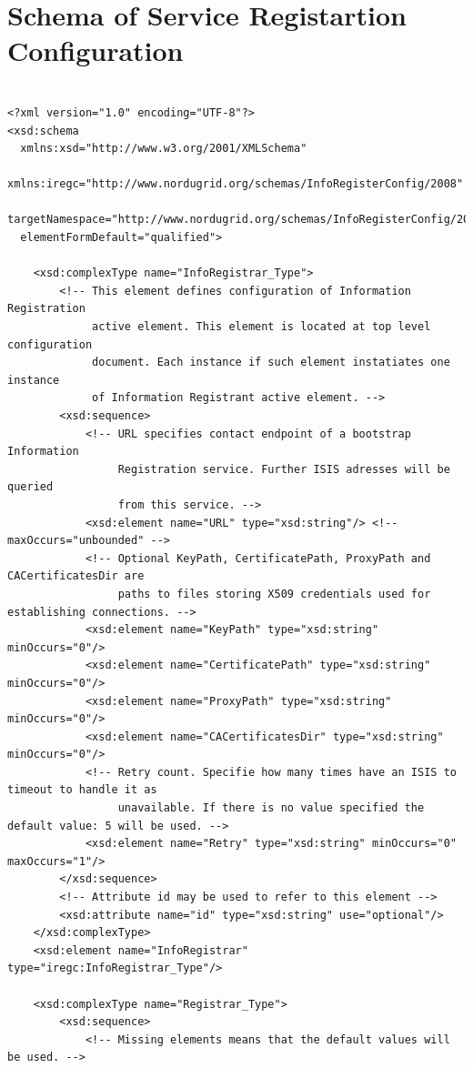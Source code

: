 \documentclass{book}
\begin{document}
\section{Schema of Service Registartion Configuration}
\label{annex:service_configuration_schema}
\begin{verbatim}

<?xml version="1.0" encoding="UTF-8"?>
<xsd:schema
  xmlns:xsd="http://www.w3.org/2001/XMLSchema"
  xmlns:iregc="http://www.nordugrid.org/schemas/InfoRegisterConfig/2008"
  targetNamespace="http://www.nordugrid.org/schemas/InfoRegisterConfig/2008"
  elementFormDefault="qualified">

    <xsd:complexType name="InfoRegistrar_Type">
        <!-- This element defines configuration of Information Registration
             active element. This element is located at top level configuration
             document. Each instance if such element instatiates one instance
             of Information Registrant active element. -->
        <xsd:sequence>
            <!-- URL specifies contact endpoint of a bootstrap Information
                 Registration service. Further ISIS adresses will be queried
                 from this service. -->
            <xsd:element name="URL" type="xsd:string"/> <!-- maxOccurs="unbounded" -->
            <!-- Optional KeyPath, CertificatePath, ProxyPath and CACertificatesDir are
                 paths to files storing X509 credentials used for establishing connections. -->
            <xsd:element name="KeyPath" type="xsd:string" minOccurs="0"/>
            <xsd:element name="CertificatePath" type="xsd:string" minOccurs="0"/>
            <xsd:element name="ProxyPath" type="xsd:string" minOccurs="0"/>
            <xsd:element name="CACertificatesDir" type="xsd:string" minOccurs="0"/>
            <!-- Retry count. Specifie how many times have an ISIS to timeout to handle it as
                 unavailable. If there is no value specified the default value: 5 will be used. -->
            <xsd:element name="Retry" type="xsd:string" minOccurs="0" maxOccurs="1"/>
        </xsd:sequence>
        <!-- Attribute id may be used to refer to this element -->
        <xsd:attribute name="id" type="xsd:string" use="optional"/>
    </xsd:complexType>
    <xsd:element name="InfoRegistrar" type="iregc:InfoRegistrar_Type"/>

    <xsd:complexType name="Registrar_Type">
        <xsd:sequence>
            <!-- Missing elements means that the default values will be used. -->


\end{verbatim}
\end{document}
